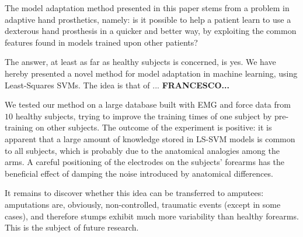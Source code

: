 The model adaptation method presented in this paper stems from a
problem in adaptive hand prosthetics, namely: is it possible to help a
patient learn to use a dexterous hand prosthesis in a quicker and
better way, by exploiting the common features found in models trained
upon other patients?

The answer, at least as far as healthy subjects is concerned, is
yes. We have hereby presented a novel method for model adaptation in
machine learning, using Least-Squares SVMs. The idea is that of
... \textbf{FRANCESCO...}

We tested our method on a large database built with EMG and force data
from $10$ healthy subjects, trying to improve the training times of
one subject by pre-training on other subjects. The outcome of the
experiment is positive: it is apparent that a large amount of
knowledge stored in LS-SVM models is common to all subjects, which is
probably due to the anatomical analogies among the arms. A careful
positioning of the electrodes on the subjects' forearms has the
beneficial effect of damping the noise introduced by anatomical
differences.

It remains to discover whether this idea can be transferred to
amputees: amputations are, obviously, non-controlled, traumatic events
(except in some cases), and therefore stumps exhibit much more
variability than healthy forearms. This is the subject of future
research.
